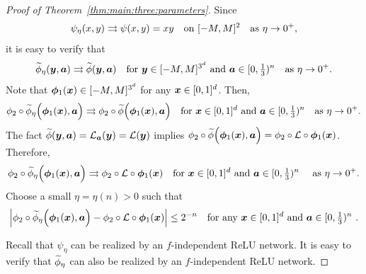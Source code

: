 \documentclass[nohyperref]{article}
\theoremstyle{plain}
\theoremstyle{definition}
\theoremstyle{remark}
\begin{document}
\begin{proof}[Proof of Theorem~\ref{thm:main:three:parameters}]
	
	Since 
	\begin{equation*}
		\psi_{\eta}(x,y)\rightrightarrows \psi(x,y)=xy\quad \textnormal{on $[-M,M]^2$\quad as $\eta\to 0^+$},
	\end{equation*}
	it is easy to verify that
	\begin{equation*}
		{\widetilde{\phi}}_{\eta}({\bm{y}},{\bm{a}})\rightrightarrows {\widetilde{\phi}}({\bm{y}},{\bm{a}})\quad \textnormal{for ${\bm{y}}\in [-M,M]^{3^d}$ and ${\bm{a}}\in [0,\tfrac13)^n$\quad as $\eta\to 0^+$}.
	\end{equation*}
	Note that ${\bm{\phi}}_1({\bm{x}})\in [-M,M]^{3^d}$ for any ${\bm{x}}\in [0,1]^d$. Then, 
	\begin{equation*}
		\phi_2\circ{\widetilde{\phi}}_{\eta}\Big({\bm{\phi}}_1({\bm{x}}),{\bm{a}}\Big)\rightrightarrows \phi_2\circ{\widetilde{\phi}}\Big({\bm{\phi}}_1({\bm{x}}),{\bm{a}}\Big)\quad \textnormal{for ${\bm{x}}\in [0,1]^d$ and ${\bm{a}}\in [0,\tfrac13)^n$\quad as $\eta\to 0^+$}.
	\end{equation*}
	The fact ${\widetilde{\phi}}({\bm{y}},{\bm{a}})={\mathcal{L}}_{\bm{a}}({\bm{y}})={\mathcal{L}}({\bm{y}})$
	implies $\phi_2\circ{\widetilde{\phi}}\Big({\bm{\phi}}_1({\bm{x}}),{\bm{a}}\Big)=\phi_2\circ{\mathcal{L}}\circ{\bm{\phi}}_1({\bm{x}})$. 
	Therefore, 
	\begin{equation*}
		\phi_2\circ{\widetilde{\phi}}_{\eta}\Big({\bm{\phi}}_1({\bm{x}}),{\bm{a}}\Big)\rightrightarrows
		\phi_2\circ{\mathcal{L}}\circ{\bm{\phi}}_1({\bm{x}})\quad \textnormal{for ${\bm{x}}\in [0,1]^d$ and ${\bm{a}}\in [0,\tfrac13)^n$ \quad as $\eta\to 0^+$}.
	\end{equation*}
	Choose a small $\eta=\eta(n)>0$ such that
	\begin{equation}\label{eq:error2}
		\Big| \phi_2\circ{\widetilde{\phi}}_{\eta}\Big({\bm{\phi}}_1({\bm{x}}),{\bm{a}}\Big)
		-\phi_2\circ{\mathcal{L}}\circ{\bm{\phi}}_1({\bm{x}})\Big|
		\le 2^{-n}\quad \textnormal{for any ${\bm{x}}\in [0,1]^d$ and ${\bm{a}}\in [0,\tfrac13)^n$ }.
	\end{equation}
	
	Recall that $\psi_\eta$ can be realized by an $f$-independent ReLU network. It is easy to verify that ${\widetilde{\phi}}_\eta$ can also be realized by an $f$-independent ReLU network.
	
	
	
	

\end{proof}
\end{document}
